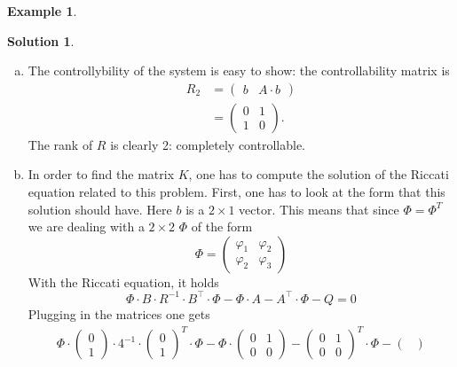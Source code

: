 \documentclass[a4paper,12 pt]{article}
\numberwithin{equation}{section}
\theoremstyle{definition}
\newtheorem{bsp}{Example}
\theoremstyle{remark}
\theoremstyle{definition}
\newtheorem*{lsg}{Solution}
\theoremstyle{definition}
\theoremstyle{definition}
\theoremstyle{remark}
\begin{document}
\begin{bsp}
\newpage
\begin{lsg}
\
\begin{enumerate}[(a)]
\item The controllybility of the system is easy to show: the controllability matrix is
\begin{equation*}
\begin{split}
R_2&=\begin{pmatrix}
b & A\cdot b
\end{pmatrix}\\
&=\begin{pmatrix}
0&1\\
1&0
\end{pmatrix}.
\end{split}
\end{equation*}
The rank of $R$ is clearly 2: completely controllable.
\item In order to find the matrix $K$, one has to compute the solution of the Riccati equation related to this problem. First, one has to look at the form that this solution should have. Here $b$ is a $2\times 1$ vector. This means that since $\Phi=\Phi^T$ we are dealing with a $2\times 2$ $\Phi$ of the form
\begin{equation*}
\Phi=\begin{pmatrix}
\varphi_1 & \varphi_2\\
\varphi_2 & \varphi_3
\end{pmatrix}
\end{equation*}
With the Riccati equation, it holds
\begin{equation*}
\Phi\cdot B\cdot R^{-1}\cdot B^\intercal\cdot \Phi-\Phi\cdot A-A^\intercal\cdot \Phi-Q=0
\end{equation*}
Plugging in the matrices one gets
\begin{equation*}
\begin{split}
\Phi \cdot \begin{pmatrix} 0\\ 1\end{pmatrix}\cdot 4^{-1}\cdot \begin{pmatrix} 0\\ 1\end{pmatrix}^T\cdot \Phi -\Phi \cdot \begin{pmatrix} 0&1\\ 0&0 \end{pmatrix}
-\begin{pmatrix} 0&1\\ 0&0 \end{pmatrix}^T\cdot \Phi -\begin{pmatrix}

\end{pmatrix}
\end{split}
\end{equation*}
\end{enumerate}
\end{lsg}
\end{bsp}
\end{document}
